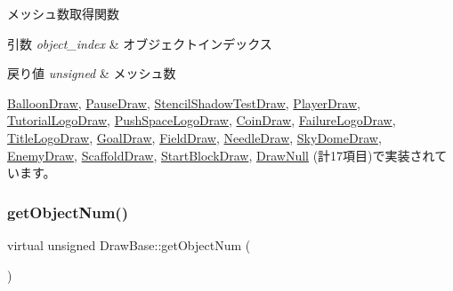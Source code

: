 メッシュ数取得関数 


\begin{DoxyParams}{引数}
{\em object\+\_\+index} & オブジェクトインデックス \\
\hline
\end{DoxyParams}

\begin{DoxyRetVals}{戻り値}
{\em unsigned} & メッシュ数 \\
\hline
\end{DoxyRetVals}


\mbox{\hyperlink{class_balloon_draw_ab6d1aa381df255809889d9f646154dc5}{Balloon\+Draw}}, \mbox{\hyperlink{class_pause_draw_ab6de445e905a481df0292de7fb1880fc}{Pause\+Draw}}, \mbox{\hyperlink{class_stencil_shadow_test_draw_a285b3045ff5cc34b6b2b991cca434bb3}{Stencil\+Shadow\+Test\+Draw}}, \mbox{\hyperlink{class_player_draw_ac618153d70492f73299c58a50d565431}{Player\+Draw}}, \mbox{\hyperlink{class_tutorial_logo_draw_a0e56784e25f1f83e6ff167280b801aad}{Tutorial\+Logo\+Draw}}, \mbox{\hyperlink{class_push_space_logo_draw_abaa66b6e3c46aa03bae21bad271eebc0}{Push\+Space\+Logo\+Draw}}, \mbox{\hyperlink{class_coin_draw_a8ebedf2582d53b40016ebd3f0e82c38e}{Coin\+Draw}}, \mbox{\hyperlink{class_failure_logo_draw_a45bb5d0965ca73b06ae0836f27f9b0e3}{Failure\+Logo\+Draw}}, \mbox{\hyperlink{class_title_logo_draw_a20a0e0c3569e49eb421ab4b5a65777cd}{Title\+Logo\+Draw}}, \mbox{\hyperlink{class_goal_draw_ac80c8da78cda7b15a4ce46f7d7057622}{Goal\+Draw}}, \mbox{\hyperlink{class_field_draw_a0894ddd73716f0db8ceed4b7d89f23fd}{Field\+Draw}}, \mbox{\hyperlink{class_needle_draw_a904f0aa7550f450f4b7bb2845c863e23}{Needle\+Draw}}, \mbox{\hyperlink{class_sky_dome_draw_a6b281bafa71c058ee83c373ad978e3bb}{Sky\+Dome\+Draw}}, \mbox{\hyperlink{class_enemy_draw_a1d8a943e4b625795bbd5ae614cc38ed1}{Enemy\+Draw}}, \mbox{\hyperlink{class_scaffold_draw_a5cbec566b4f66a0c87eca20e88c81b19}{Scaffold\+Draw}}, \mbox{\hyperlink{class_start_block_draw_a15cefedde4eab371fa2229d86c54455d}{Start\+Block\+Draw}}, \mbox{\hyperlink{class_draw_null_a4c566a37d27fac3dcf76c7970443f375}{Draw\+Null}} (計17項目)で実装されています。

\mbox{\label{class_draw_base_a57c010b4386dc09afa124fba81a6e0fc}} 
\subsubsection{\texorpdfstring{get\+Object\+Num()}{getObjectNum()}}
{\footnotesize\ttfamily virtual unsigned Draw\+Base\+::get\+Object\+Num (\begin{DoxyParamCaption}{ }\end{DoxyParamCaption})\hspace{0.3cm}{\ttfamily [pure virtual]}}



